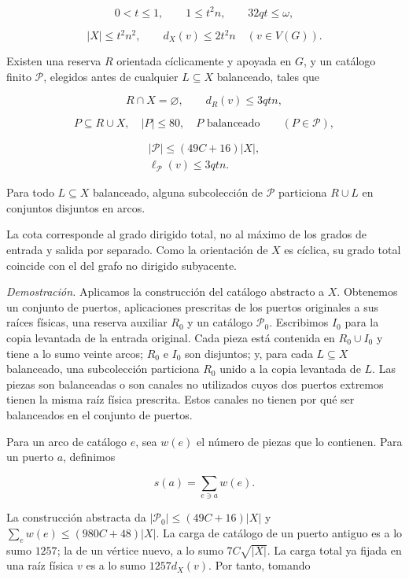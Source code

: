 \documentclass[spanish,11pt,a4paper]{article}
\begin{document}
\[0<t\le1,\qquad 1\le t^2n,\qquad32qt\le\omega,\]

\[|X|\le t^2n^2,\qquad d_X(v)\le2t^2n\quad(v\in V(G)).\]

Existen una reserva \(R\) orientada cíclicamente y apoyada en \(G\), y un catálogo finito \(\mathcal P\), elegidos antes de cualquier \(L\subseteq X\) balanceado, tales que

\[R\cap X=\varnothing,\qquad d_R(v)\le3qtn,\]

\[P\subseteq R\cup X,\quad |P|\le80,\quad P\text{ balanceado}
\qquad(P\in\mathcal P),\]

\[\begin{gathered}
|\mathcal P|\le(49C+16)|X|,\\
\ell_{\mathcal P}(v)\le3qtn.
\end{gathered}\]

Para todo \(L\subseteq X\) balanceado, alguna subcolección de \(\mathcal P\) particiona \(R\cup L\) en conjuntos disjuntos en arcos.

La cota corresponde al grado dirigido total, no al máximo de los grados de entrada y salida por separado. Como la orientación de \(X\) es cíclica, su grado total coincide con el del grafo no dirigido subyacente.

\emph{Demostración.} Aplicamos la construcción del catálogo abstracto a \(X\). Obtenemos un conjunto de puertos, aplicaciones prescritas de los puertos originales a sus raíces físicas, una reserva auxiliar \(R_0\) y un catálogo \(\mathcal P_0\). Escribimos \(I_0\) para la copia levantada de la entrada original. Cada pieza está contenida en \(R_0\cup I_0\) y tiene a lo sumo veinte arcos; \(R_0\) e \(I_0\) son disjuntos; y, para cada \(L\subseteq X\) balanceado, una subcolección particiona \(R_0\) unido a la copia levantada de \(L\). Las piezas son balanceadas o son canales no utilizados cuyos dos puertos extremos tienen la misma raíz física prescrita. Estos canales no tienen por qué ser balanceados en el conjunto de puertos.

Para un arco de catálogo \(e\), sea \(w(e)\) el número de piezas que lo contienen. Para un puerto \(a\), definimos

\[s(a)=\sum_{e\ni a}w(e).\]

La construcción abstracta da \(|\mathcal P_0|\le(49C+16)|X|\) y \(\sum_e w(e)\le(980C+48)|X|\). La carga de catálogo de un puerto antiguo es a lo sumo \(1257\); la de un vértice nuevo, a lo sumo \(7C\sqrt{|X|}\). La carga total ya fijada en una raíz física \(v\) es a lo sumo \(1257d_X(v)\). Por tanto, tomando
\end{document}
